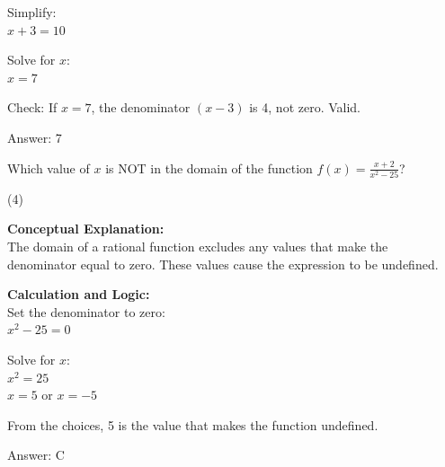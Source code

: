 \documentclass[11pt,paper=a4,answers]{exam}
\begin{document}
\begin{questions}
\begin{solution}
\vspace{10pt}

Simplify: \\
$x + 3 = 10$

\vspace{10pt}

Solve for $x$: \\
$x = 7$

\vspace{10pt}

Check: If $x=7$, the denominator $(x-3)$ is 4, not zero. Valid.

\vspace{25pt}

Answer: \colorbox{yellow!100}{7}
\end{solution}

\vspace{40pt}

\question
Which value of $x$ is NOT in the domain of the function $f(x) = \frac{x+2}{x^2 - 25}$?
\begin{tasks}(4)
\end{tasks}

\begin{solution}
\textbf{Conceptual Explanation:} \\
The domain of a rational function excludes any values that make the denominator equal to zero. These values cause the expression to be undefined.

\vspace{20pt}

\textbf{Calculation and Logic:} \\
Set the denominator to zero: \\
$x^2 - 25 = 0$

\vspace{10pt}

Solve for $x$: \\
$x^2 = 25$ \\
$x = 5$ or $x = -5$

\vspace{10pt}

From the choices, 5 is the value that makes the function undefined.

\vspace{25pt}

Answer: \colorbox{yellow!100}{C}
\end{solution}


\end{questions}
\end{document}
